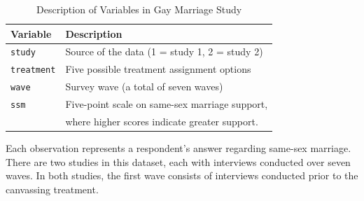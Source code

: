 \documentclass[12pt]{article}
\begin{document}
\begin{table}[H]
\centering
\caption{Description of Variables in Gay Marriage Study}\label{tab:gay-data}
\begin{tabular}{ll}
\toprule
\textbf{Variable} & \textbf{Description} \\
\midrule
\texttt{study} & Source of the data (1 = study 1, 2 = study 2) \\
\texttt{treatment} & Five possible treatment assignment options \\
\texttt{wave} & Survey wave (a total of seven waves) \\
\texttt{ssm} & Five-point scale on same-sex marriage support, \\ 
& where higher scores indicate greater support. \\
\bottomrule
\end{tabular}
\end{table}

Each observation represents a respondent’s answer regarding same-sex marriage. There are two studies in this dataset, each with interviews conducted over seven waves. In both studies, the first wave consists of interviews conducted prior to the canvassing treatment.
\end{document}
